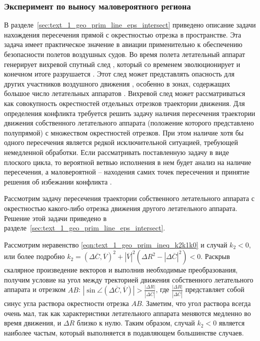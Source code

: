 \subsubsection{Эксперимент по выносу маловероятного региона}

В разделе~\ref{sec:text_1_geo_prim_line_eps_intersect} приведено описание задачи нахождения пересечения прямой с окрестностью отрезка в пространстве.
Эта задача имеет практическое значение в авиации применительно к обеспечению безопасности полетов воздушных судов.
Во время полета летательный аппарат генерирует вихревой спутный след \cite{Aubakirov1999Wake}, который со временем эволюционирует и конечном итоге разрушается \cite{Vyshinsky2006Wake}.
Этот след может представлять опасность для других участников воздушного движения \cite{Babkin2008Wake}, особенно в зонах, содержащих большое число летательных аппаратов \cite{Burluzky2014Wake}.
Вихревой след может рассматриваться как совокупность окрестностей отдельных отрезков траектории движения.
Для определения конфликта требуется решить задачу наличия пересечения траектории движения собственного летательного аппарата (положение которого представлено полупрямой) с множеством окрестностей отрезков.
При этом наличие хотя бы одного пересечения является редкой исключительной ситуацией, требующей немедленной обработки.
Если рассматривать поставленную задачу в виде плоского цикла, то вероятной ветвью исполнения в нем будет анализ на наличие пересечения, а маловероятной -- находения самих точек пересечения и принятие решения об избежании конфликта \cite{Rybakov2017Flight,Rybakov2022VecGeom}.

Рассмотрим задачу пересечения траектории собственного летательного аппарата с окрестностью какого-либо отрезка движения другого летательного аппарата.
Решение этой задачи приведено в разделе~\ref{sec:text_1_geo_prim_line_eps_intersect}.

Рассмотрим неравенство \eqref{eqn:text_1_geo_prim_ineq_k2k1k0} и случай $k_2 < 0$, или более подробно $k_2 = (\Delta \overline{C}, \overline{V})^2 + |\overline{V}|^2 \left( \Delta R^2 - |\Delta \overline{C}|^2 \right) < 0$.
Раскрыв скалярное произведение векторов и выполнив необходимые преобразования, получим условие на угол между тректорией движения собственного летательного аппарата и отрезком $AB$: $\left| \sin{\angle(\Delta \overline{C}, \overline{V})} \right| > \frac{|\Delta R|}{|\Delta \overline{C}|}$, где $\frac{|\Delta R|}{|\Delta \overline{C}|}$ представляет собой синус угла раствора окрестности отрезка $AB$.
Заметим, что угол раствора всегда очень мал, так как характеристики летательного аппарата меняются медленно во время движения, и $\Delta R$ близко к нулю.
Таким образом, случай $k_2 < 0$ является наиболее частым, который выполняется в подавляющем большинстве случаев.

